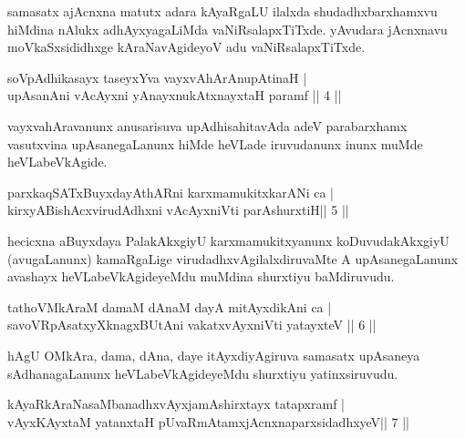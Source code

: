 \begin{artha}
samasatx ajAcnxna matutx adara kAyaRgaLU ilalxda shudadhxbarxhamxvu hiMdina nAlukx adhAyxyagaLiMda vaNiRsalapxTiTxde. yAvudara jAcnxnavu moVkaSxsididhxge kAraNavAgideyoV adu vaNiRsalapxTiTxde.
\end{artha}

\begin{shl}
soVpAdhikasayx taseyxYva vayxvAhArAnupAtinaH |\\
upAsanAni vAcAyxni yAnayxnukAtxnayxtaH paramf \hfill||  4 ||  
\end{shl}

\begin{artha}
vayxvahAravanunx anusarisuva upAdhisahitavAda adeV parabarxhamx vasutxvina upAsanegaLanunx hiMde heVLade iruvudanunx inunx muMde heVLabeVkAgide.
\end{artha}


\begin{shl}
parxkaqSATxBuyxdayAthARni karxmamukitxkarANi ca  | \\
kirxyABishAcxvirudAdhxni vAcAyxniVti parAshurxtiH\hfill||  5  ||  
\end{shl}

\begin{artha}
hecicxna aBuyxdaya PalakAkxgiyU karxmamukitxyanunx koDuvudakAkxgiyU (avugaLanunx) kamaRgaLige virudadhxvAgilalxdiruvaMte A upAsanegaLanunx avashayx heVLabeVkAgideyeMdu muMdina shurxtiyu baMdiruvudu.
\end{artha}



\begin{shl}
tathoVMkAraM damaM dAnaM dayA mitAyxdikAni ca  | \\
savoVRpAsatxyXknagxBUtAni vakatxvAyxniVti yatayxteV \hfill||  6 ||   
\end{shl}

\begin{artha}
hAgU OMkAra, dama, dAna, daye itAyxdiyAgiruva samasatx upAsaneya sAdhanagaLanunx heVLabeVkAgideyeMdu shurxtiyu yatinxsiruvudu.
\end{artha}


\begin{shl}
kAyaRkAraNasaMbanadhxvAyxjamAshirxtayx tatapxramf  | \\
vAyxKAyxtaM yatanxtaH pUvaRmAtamxjAcnxnaparxsidadhxyeV\hfill ||  7 ||  
\end{shl}

